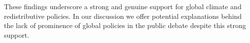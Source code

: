 These findings underscore a strong and genuine support for global climate and redistributive policies. %
In our discussion we offer potential explanations behind the lack of prominence of global policies in the public debate despite this strong support. %







